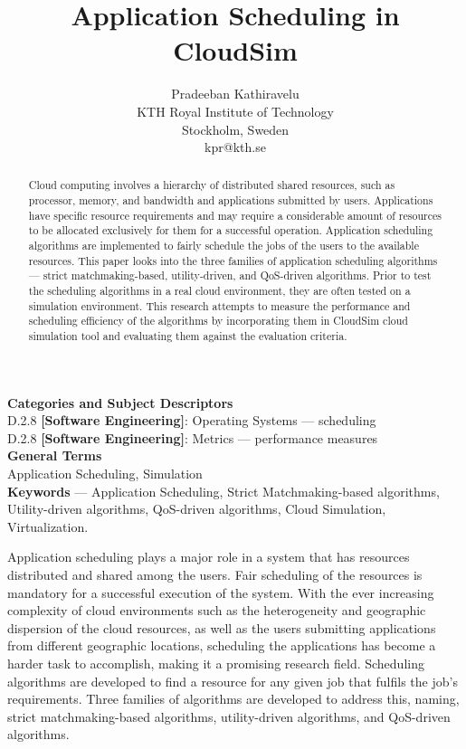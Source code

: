 \documentclass[times, 10pt,twocolumn]{article}
\begin{document}
\title{Application Scheduling in CloudSim}

\author{Pradeeban Kathiravelu\\
KTH Royal Institute of Technology\\
Stockholm, Sweden \\ kpr@kth.se\\
}

\maketitle
\thispagestyle{empty}
\begin{abstract}
   Cloud computing involves a  hierarchy of distributed shared resources, such as processor, memory, and bandwidth and applications submitted by users. Applications have specific resource requirements and may require a considerable amount of resources to be allocated exclusively for them for a successful operation. Application scheduling algorithms are implemented to fairly schedule the jobs of the users to the available resources. This paper looks into the three families of application scheduling algorithms --- strict matchmaking-based, utility-driven, and QoS-driven algorithms. Prior to test the scheduling algorithms in a real cloud environment, they are often tested on a simulation environment. This research attempts to measure the performance and scheduling efficiency of the algorithms by incorporating them in CloudSim cloud simulation tool and evaluating them against the evaluation criteria. 
\end{abstract}


\textbf{Categories and Subject Descriptors}\\
D.2.8 \textbf{[Software Engineering]}: Operating Systems --- scheduling\\
D.2.8 \textbf{[Software Engineering]}: Metrics --- performance measures\\
\textbf{General Terms}\\
Application Scheduling, Simulation\\
\textbf{Keywords} ---  Application Scheduling, Strict Matchmaking-based algorithms, Utility-driven algorithms, QoS-driven algorithms, Cloud Simulation, Virtualization.


Application scheduling plays a major role in a system that has resources distributed and shared among the users. Fair scheduling of the resources is mandatory for a successful execution of the system. With the ever increasing complexity of cloud environments such as the heterogeneity and geographic dispersion of the cloud resources, as well as the users submitting applications from different geographic locations, scheduling the applications has become a harder task to accomplish, making it a promising research field. Scheduling algorithms are developed to find a resource for any given job that fulfils the job's requirements. Three families of algorithms are developed to address this, naming, strict matchmaking-based algorithms, utility-driven algorithms, and QoS-driven algorithms.
\end{document}
